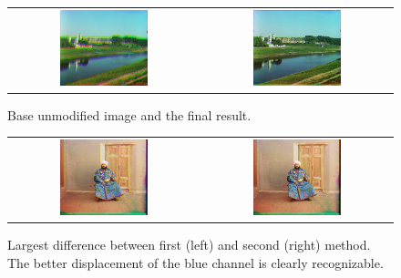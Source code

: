 \begin{figure}[h]
	\centering
	\begin{tabular}{cc}
	\includegraphics[width=0.48\textwidth]{figures/00125_base.png} &
	\includegraphics[width=0.48\textwidth]{figures/00125_v2.png} 

	\end{tabular}
	\caption{Base unmodified image and the final result. }
	\label{fig:a1:alignment}
\end{figure}

\begin{figure}[h]
	\centering
	\begin{tabular}{cc}
	\includegraphics[width=0.48\textwidth]{figures/00153_v1.png} &
	\includegraphics[width=0.48\textwidth]{figures/00153_v2.png} 

	\end{tabular}
	\caption{Largest difference between first (left) and second (right) method. The better displacement of the blue channel is clearly recognizable. }
	\label{fig:a1:difference_v1_v2}
\end{figure}


